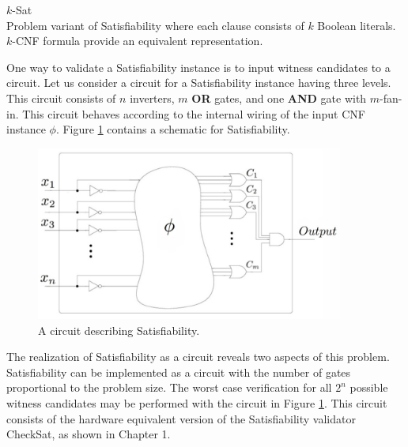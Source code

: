 \begin{definition}
$k$-{\sc Sat}\\
Problem variant of {\sc Satisfiability} where each clause consists of $k$ Boolean literals.  $k$-CNF formula provide an equivalent representation.
\end{definition}


One way to validate a {\sc Satisfiability} instance is to input witness candidates to a circuit.  Let us consider a circuit for a {\sc Satisfiability} instance having three levels.  This circuit consists of $n$ inverters, $m$ \textbf{OR} gates, and one \textbf{AND} gate with $m$-fan-in.  This circuit behaves according to the internal wiring of the input CNF instance $\phi$. Figure \ref{blackBoxSat} contains a schematic for {\sc Satisfiability}.	

\begin{figure}[htbp]
\begin{center}

	\includegraphics[width=0.9\textwidth]{figures/circuitLabeled.jpg}

\caption{A circuit describing {\sc Satisfiability}.}
\label{blackBoxSat}
\end{center}
\end{figure}
	
\FloatBarrier

The realization of {\sc Satisfiability} as a circuit reveals two aspects of this problem.  {\sc Satisfiability} can be implemented as a circuit with the number of gates proportional to the problem size.  The worst case verification for all $2^n$ possible witness candidates may be performed with the circuit in Figure \ref{blackBoxSat}.  This circuit consists of the hardware equivalent version of the {\sc Satisfiability} validator {\sc CheckSat}, as shown in Chapter 1.  
	

